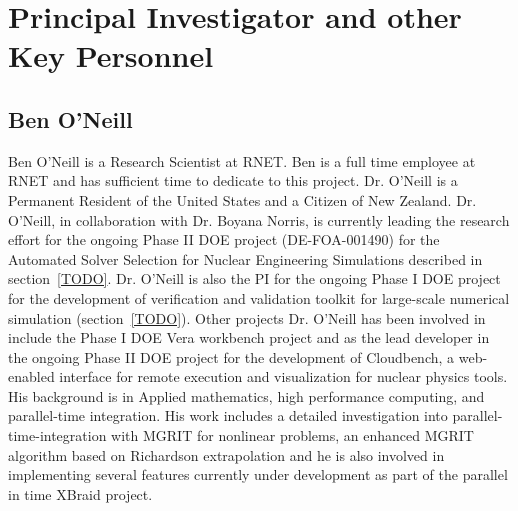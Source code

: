 \section{Principal Investigator and other Key Personnel}

\subsection{Ben O'Neill}
Ben O'Neill is a Research Scientist at RNET. Ben is a full time employee at
RNET and has sufficient time to dedicate to this project. Dr. O'Neill is a Permanent Resident of the United States 
and a Citizen of New Zealand. Dr. O'Neill, in collaboration with Dr. Boyana Norris, is currently leading the research effort for the  
ongoing Phase II DOE project (DE-FOA-001490) for the Automated Solver Selection for Nuclear Engineering 
Simulations described in section~\ref{TODO}. Dr. O'Neill is also the PI for the ongoing Phase I DOE project for 
the development of verification and validation toolkit for large-scale numerical simulation (section~\ref{TODO}). Other projects Dr. O'Neill
has been involved in include the Phase I DOE Vera workbench project and as the lead developer in the ongoing Phase II 
DOE project for the development of Cloudbench, a web-enabled interface for remote execution and visualization for nuclear 
physics tools. His background is in Applied mathematics, high performance computing,
and parallel-time integration. His work includes a detailed investigation into parallel-time-integration
with MGRIT for nonlinear problems, an enhanced MGRIT algorithm based on Richardson extrapolation and he is also
involved in implementing several features currently under development as part of the parallel in time XBraid project.

